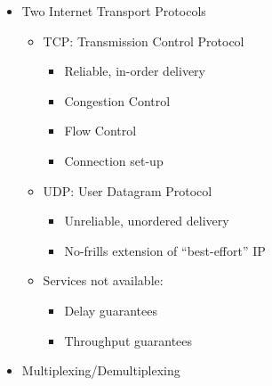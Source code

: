\begin{itemize}
\begin{itemize}
\begin{itemize}
        \end{itemize}

    \end{itemize}

  \item Two Internet Transport Protocols

    \begin{itemize}

      \item TCP: Transmission Control Protocol

        \begin{itemize}

          \item Reliable, in-order delivery

          \item Congestion Control

          \item Flow Control

          \item Connection set-up

        \end{itemize}

      \item UDP: User Datagram Protocol

        \begin{itemize}
            
          \item Unreliable, unordered delivery

          \item No-frills extension of ``best-effort'' IP

        \end{itemize}

      \item Services not available:

        \begin{itemize}

          \item Delay guarantees

          \item Throughput guarantees

        \end{itemize}

    \end{itemize}

  \item Multiplexing/Demultiplexing


\end{itemize}
